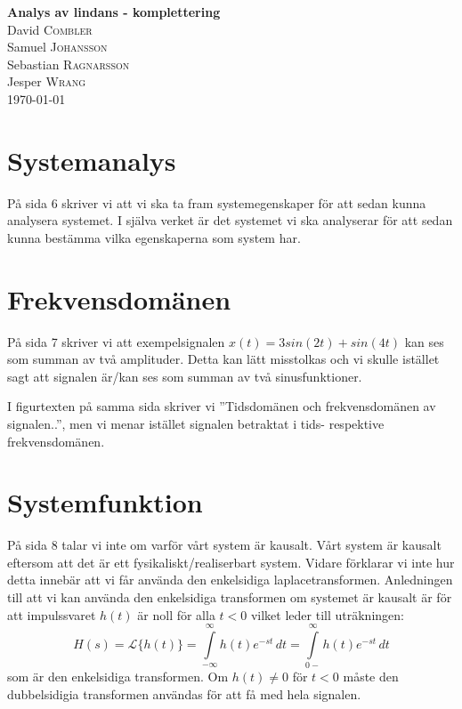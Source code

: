 \documentclass[usenames,dvipsnames]{article}
\begin{document}
\begin{center}
\huge{\bfseries Analys av lindans - komplettering}\\[3cm]
\Large{David \textsc{Combler}\\
        Samuel \textsc{Johansson}\\
        Sebastian \textsc{Ragnarsson}\\
        Jesper \textsc{Wrang}}\\[2cm]
       {\Large \today}\\[3cm]
\end{center}
\newpage
\section{Systemanalys}
På sida 6 skriver vi att vi ska ta fram systemegenskaper för att sedan kunna analysera systemet. I själva verket är det systemet vi ska analyserar för att sedan kunna bestämma vilka egenskaperna som system har.

\section{Frekvensdomänen}
På sida 7 skriver vi att exempelsignalen $x(t) = 3sin(2t) + sin(4t)$ kan ses som summan av två amplituder. Detta kan lätt misstolkas och vi skulle istället sagt att signalen är/kan ses som summan av två sinusfunktioner. 

I figurtexten på samma sida skriver vi ''Tidsdomänen och frekvensdomänen av signalen..'', men vi menar istället signalen betraktat i tids- respektive frekvensdomänen.

\section{Systemfunktion}
På sida 8 talar vi inte om varför vårt system är kausalt. Vårt system är kausalt eftersom att det är ett fysikaliskt/realiserbart system. Vidare förklarar vi inte hur detta innebär att vi får använda den enkelsidiga laplacetransformen. Anledningen till att vi kan använda den enkelsidiga transformen om systemet är kausalt är för att impulssvaret $h(t)$ är noll för alla $t < 0$ vilket leder till uträkningen:
$$H(s) = \mathcal{L}\big\{h(t)\big\} = \int\limits_{-\infty}^{\infty} h(t)e^{-st}\,dt = \int\limits_{0-}^{\infty} h(t)e^{-st}\,dt$$
som är den enkelsidiga transformen. Om $h(t)\ne 0$ för $t < 0$ måste den dubbelsidigia transformen användas för att få med hela signalen.
\end{document}
